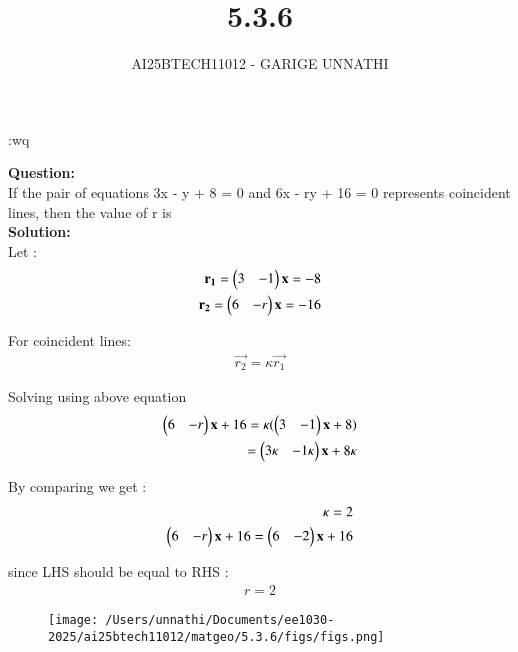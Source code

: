 \documentclass[journal]{IEEEtran}
\begin{document}

\vspace{3cm}

\title{5.3.6}
\author{AI25BTECH11012 - GARIGE UNNATHI}
{\let\newpage\relax\maketitle}


\renewcommand{\thefigure}{\theenumi}
\renewcommand{\thetable}{\theenumi}
\setlength{\intextsep}{10pt} %


:wq

\renewcommand{\thetable}{\theenumi}


\textbf{Question:}\\
If the pair of equations 3x - y + 8 = 0 and 6x - ry + 16 = 0 represents coincident
lines, then the value of r is  \\

\textbf{Solution:}\\
Let :
\begin{align}
    \mathbf{r_1} = \begin{pmatrix}3 & -1 \end{pmatrix}\mathbf{x} = -8 \\
    \mathbf{r_2} = \begin{pmatrix}6 & -r\end{pmatrix}\mathbf{x} = -16
\end{align}

For coincident lines:
\begin{align}
    \vec{r_2} = \kappa  \vec{r_1}
\end{align}

Solving using above equation 
\begin{align}
    \begin{pmatrix}6 & -r\end{pmatrix}\mathbf{x} + 16 = \kappa(\begin{pmatrix}3 & -1 \end{pmatrix}\mathbf{x} + 8)\\
     = \begin{pmatrix}3\kappa & -1\kappa \end{pmatrix}\mathbf{x} + 8\kappa
\end{align}

By comparing we get :
\begin{align}
    \kappa = 2\\
     \begin{pmatrix}6 & -r\end{pmatrix}\mathbf{x} + 16 = \begin{pmatrix}6 & -2 \end{pmatrix}\mathbf{x} + 16
\end{align}

since LHS should be equal to RHS :
\begin{align}    r = 2
\end{align}

\begin{figure}[h!]
   \centering
   \texttt{[image: /Users/unnathi/Documents/ee1030-2025/ai25btech11012/matgeo/5.3.6/figs/figs.png]}
   \caption{}
   \label{stemplot}
\end{figure}
\end{document}

